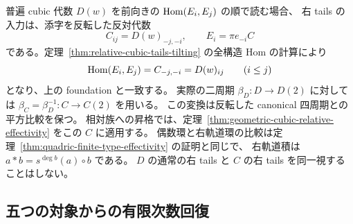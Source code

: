 普遍 cubic 代数 $D(w)$ を前向きの $\operatorname{Hom}(E_i,E_j)$ の順で読む場合、
右 tails の入力は、添字を反転した反対代数
\begin{equation}\label{eq:quintuple-right-tails-convention}
 C_{ij}=D(w)_{-j,-i},\qquad E_i=\pi e_{-i}C
\end{equation}
である。定理~\ref{thm:relative-cubic-tails-tilting} の全構造 Hom の計算により
\[
 \operatorname{Hom}(E_i,E_j)=C_{-j,-i}=D(w)_{ij}\qquad(i\le j)
\]
となり、上の foundation と一致する。
実際の二周期 $\beta_D:D\to D(2)$ に対しては
$\beta_C=\beta_D^{-1}:C\to C(2)$ を用いる。
この変換は反転した canonical 四周期との平方比較を保つ。
相対族への昇格では、定理~\ref{thm:geometric-cubic-relative-effectivity} をこの $C$ に適用する。
偶数環と右軌道環の比較は定理~\ref{thm:quadric-finite-type-effectivity} の証明と同じで、
右軌道積は $a*b=s^{\deg b}(a)\circ b$ である。
$D$ の通常の右 tails と $C$ の右 tails を同一視することはしない。

\subsection{五つの対象からの有限次数回復}

